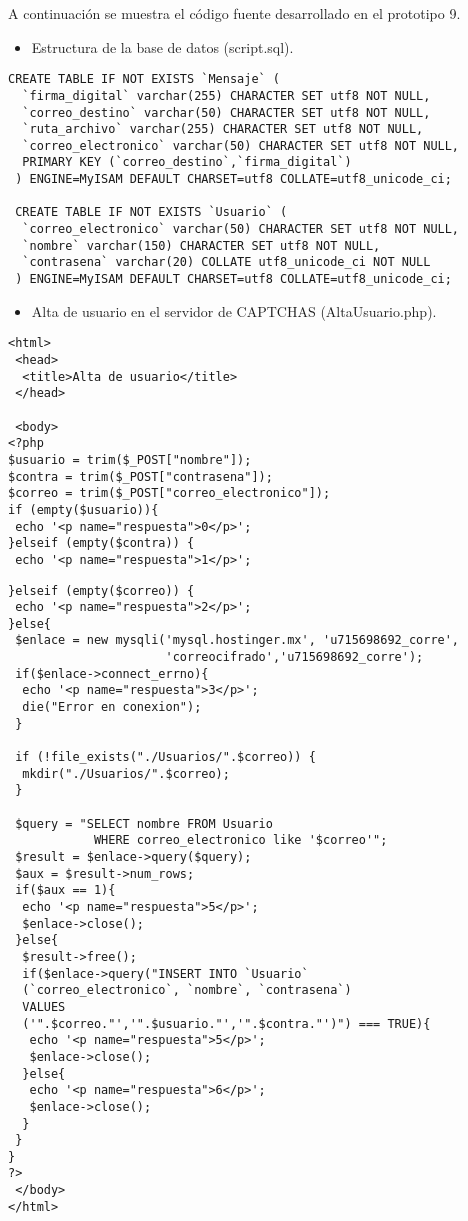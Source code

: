 A continuación se muestra el código fuente desarrollado en el prototipo 9.
\begin{itemize}
\item Estructura de la base de datos (script.sql).
\end{itemize}

 \begin{lstlisting}[frame=single]
 CREATE TABLE IF NOT EXISTS `Mensaje` (
  `firma_digital` varchar(255) CHARACTER SET utf8 NOT NULL,
  `correo_destino` varchar(50) CHARACTER SET utf8 NOT NULL,
  `ruta_archivo` varchar(255) CHARACTER SET utf8 NOT NULL,
  `correo_electronico` varchar(50) CHARACTER SET utf8 NOT NULL,
  PRIMARY KEY (`correo_destino`,`firma_digital`)
 ) ENGINE=MyISAM DEFAULT CHARSET=utf8 COLLATE=utf8_unicode_ci;

 CREATE TABLE IF NOT EXISTS `Usuario` (
  `correo_electronico` varchar(50) CHARACTER SET utf8 NOT NULL,
  `nombre` varchar(150) CHARACTER SET utf8 NOT NULL,
  `contrasena` varchar(20) COLLATE utf8_unicode_ci NOT NULL
 ) ENGINE=MyISAM DEFAULT CHARSET=utf8 COLLATE=utf8_unicode_ci;
 \end{lstlisting}
\begin{itemize}
\item Alta de usuario en el servidor de CAPTCHAS (AltaUsuario.php).
\end{itemize}

 \begin{lstlisting}[frame=single]
 <html>
 <head>
  <title>Alta de usuario</title> 
 </head>

 <body>
<?php
$usuario = trim($_POST["nombre"]);
$contra = trim($_POST["contrasena"]);
$correo = trim($_POST["correo_electronico"]);
if (empty($usuario)){
 echo '<p name="respuesta">0</p>';
}elseif (empty($contra)) {
 echo '<p name="respuesta">1</p>';
\end{lstlisting}
\begin{lstlisting}[frame=single]
}elseif (empty($correo)) {
 echo '<p name="respuesta">2</p>';
}else{
 $enlace = new mysqli('mysql.hostinger.mx', 'u715698692_corre',
                      'correocifrado','u715698692_corre');
 if($enlace->connect_errno){
  echo '<p name="respuesta">3</p>';
  die("Error en conexion");
 }

 if (!file_exists("./Usuarios/".$correo)) {
  mkdir("./Usuarios/".$correo);
 }

 $query = "SELECT nombre FROM Usuario 
            WHERE correo_electronico like '$correo'";
 $result = $enlace->query($query);
 $aux = $result->num_rows;
 if($aux == 1){
  echo '<p name="respuesta">5</p>';
  $enlace->close();
 }else{
  $result->free();
  if($enlace->query("INSERT INTO `Usuario`
  (`correo_electronico`, `nombre`, `contrasena`) 
  VALUES 
  ('".$correo."','".$usuario."','".$contra."')") === TRUE){
   echo '<p name="respuesta">5</p>';
   $enlace->close();
  }else{
   echo '<p name="respuesta">6</p>';
   $enlace->close();
  }
 }
}
?>
 </body>
</html>
 \end{lstlisting}

